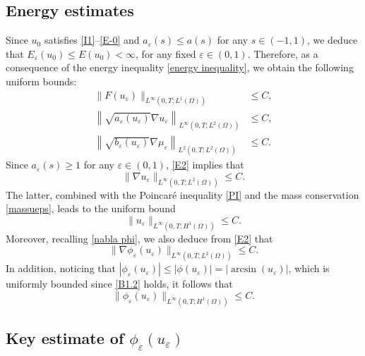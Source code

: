 \documentclass[11pt,  reqno]{amsart}%
\theoremstyle{plain}
\theoremstyle{definition}
\theoremstyle{remark}
\numberwithin{equation}{section}
\newcommand{\ve}{\varepsilon}
\begin{document}
\subsection{Energy estimates}
\label{ss1}
Since $u_0$ satisfies \eqref{I1}--\eqref{E-0} and $a_{\ve}(s) \le a(s)$ for any $s\in (-1,1)$, we deduce that $E_{\ve}(u_0) \leq E(u_0)<\infty$, for any fixed $\ve \in (0,1)$.  Therefore, as a consequence of the energy inequality \eqref{energy inequality}, we obtain the following uniform bounds: 
	\begin{align}
		\| F(u_{\ve}) \|_{L^{\infty}(0,T; L^{1}(\Omega))} &\leq C, \label{E1}\\
        \left\|\sqrt{ a_{\ve}(u_{\ve}) }\nabla u_{\ve} \right\|_{L^{\infty}(0,T; L^2(\Omega))} &\leq C, \label{E2}\\
        \left\|\sqrt{ b_{\ve}(u_{\ve}) }\nabla \mu_{\ve} \right\|_{L^{2}(0,T; L^2(\Omega))} &\leq C. \label{E3}
	\end{align}
    Since $a_{\ve}(s) \ge 1$ for any $\ve \in (0,1)$, \eqref{E2} implies that
    \begin{equation}
        \label{E2bis}
        \| \nabla u_{\ve} \|_{L^{\infty}(0,T; L^{2}(\Omega))} \leq C.
    \end{equation}
The latter, combined with the Poincar\'{e} inequality \eqref{PI} and the mass conservation \eqref{massueps}, leads to the uniform bound
    \begin{equation}
        \label{E2tris}
        \| u_{\ve} \|_{L^{\infty}(0,T; H^{1}(\Omega))} \leq C.
    \end{equation}
 Moreover, recalling \eqref{nabla phi}, we also deduce from \eqref{E2}  that
    \begin{equation}
        \label{E2quattro}
        \| \nabla \phi_{\ve}(u_{\ve}) \|_{L^{\infty}(0,T; L^{2}(\Omega))} \leq C.
    \end{equation}
In addition, noticing that $|\phi_{\ve}(u_{\ve})| \le |\phi(u_{\ve})|= |\arcsin (u_\varepsilon)|$, which is uniformly bounded since \eqref{B1.2} holds, it follows that
	\begin{equation} \label{E2cinque}
		\| \phi_{\ve}(u_{\ve})\|_{L^{\infty}(0,T; H^1(\Omega))} \leq C.
	\end{equation}


\subsection{Key estimate of $\phi_\varepsilon(u_\varepsilon)$}
\label{Novel}
\end{document}
